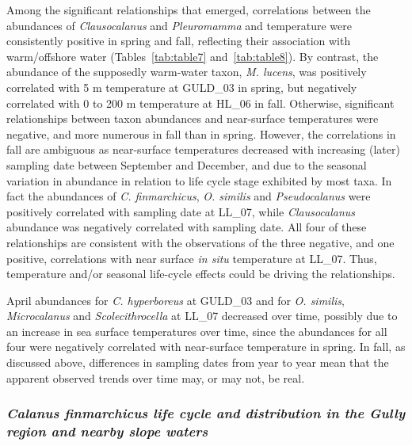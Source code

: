 \documentclass[12pt]{article}\usepackage[]{graphicx}\usepackage[]{color}
\begin{document}
Among the significant relationships that emerged, correlations between the abundances of \emph{Clausocalanus} and \emph{Pleuromamma} and temperature were consistently positive in spring and fall, reflecting their association with warm/offshore water (Tables~\ref{tab:table7} and~\ref{tab:table8}). By contrast, the abundance of the supposedly warm-water taxon, \emph{M. lucens}, was positively correlated with 5 m temperature at GULD\_03 in spring, but negatively correlated with 0 to 200 m temperature at HL\_06 in fall. Otherwise, significant relationships between taxon abundances and near-surface temperatures were negative, and more numerous in fall than in spring. However, the correlations in fall are ambiguous as near-surface temperatures decreased with increasing (later) sampling date between September and December, and due to the seasonal variation in abundance in relation to life cycle stage exhibited by most taxa. In fact the abundances of \emph{C. finmarchicus}, \emph{O. similis} and \emph{Pseudocalanus} were positively correlated with sampling date at LL\_07, while \emph{Clausocalanus} abundance was negatively correlated with sampling date. All four of these relationships are consistent with the observations of the three negative, and one positive, correlations with near surface \emph{in situ} temperature at LL\_07. Thus, temperature and/or seasonal life-cycle effects could be driving the relationships.

April abundances for \emph{C. hyperboreus} at GULD\_03 and for \emph{O. similis}, \emph{Microcalanus} and \emph{Scolecithrocella} at LL\_07 decreased over time, possibly due to an increase in sea surface temperatures over time, since the abundances for all four were negatively correlated with near-surface temperature in spring. In fall, as discussed above, differences in sampling dates from year to year mean that the apparent observed trends over time may, or may not, be real.

\hypertarget{calanus-finmarchicus-life-cycle-and-distribution-in-the-gully-region-and-nearby-slope-waters}{%
\subsubsection{\texorpdfstring{\emph{Calanus finmarchicus life cycle and distribution in the Gully region and nearby slope waters}}{Calanus finmarchicus life cycle and distribution in the Gully region and nearby slope waters}}\label{calanus-finmarchicus-life-cycle-and-distribution-in-the-gully-region-and-nearby-slope-waters}}
\end{document}

